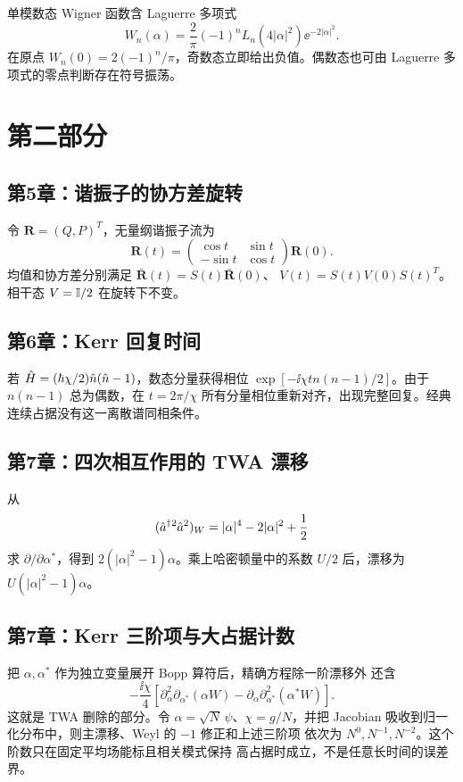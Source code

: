 单模数态 Wigner 函数含 Laguerre 多项式
\[
  W_n(\alpha)=\frac{2}{\pi}(-1)^n
  L_n(4|\alpha|^2)\ee^{-2|\alpha|^2}.
\]
在原点 $W_n(0)=2(-1)^n/\pi$，奇数态立即给出负值。偶数态也可由 Laguerre 多项式的零点判断存在符号振荡。

\section{第二部分}

\subsection*{第5章：谐振子的协方差旋转}

令 $\bm R=(Q,P)^T$，无量纲谐振子流为
\[
  \bm R(t)=
  \begin{pmatrix}\cos t&\sin t\\-\sin t&\cos t\end{pmatrix}\bm R(0).
\]
均值和协方差分别满足
$\bar{\bm R}(t)=S(t)\bar{\bm R}(0)$、
$V(t)=S(t)V(0)S(t)^T$。相干态 $V=\mathbb{I}/2$ 在旋转下不变。

\subsection*{第6章：Kerr 回复时间}

若
$\hat H=(\hbar\chi/2)\hat n(\hat n-1)$，数态分量获得相位
$\exp[-\ii\chi t n(n-1)/2]$。由于 $n(n-1)$ 总为偶数，在
$t=2\pi/\chi$ 所有分量相位重新对齐，出现完整回复。经典连续占据没有这一离散谱同相条件。

\subsection*{第7章：四次相互作用的 TWA 漂移}

从
\[
  (\hat a^{\dagger}{}^2\hat a^2)_W=|\alpha|^4-2|\alpha|^2+\frac12
\]
求 $\partial/\partial\alpha^*$，得到
$2(|\alpha|^2-1)\alpha$。乘上哈密顿量中的系数 $U/2$ 后，漂移为
$U(|\alpha|^2-1)\alpha$。

\subsection*{第7章：Kerr 三阶项与大占据计数}

把 $\alpha,\alpha^*$ 作为独立变量展开 Bopp 算符后，精确方程除一阶漂移外
还含
\[
  -\frac{\ii\chi}{4}\left[
  \partial_\alpha^2\partial_{\alpha^*}(\alpha W)
  -\partial_\alpha\partial_{\alpha^*}^2(\alpha^*W)
  \right].
\]
这就是 TWA 删除的部分。令 $\alpha=\sqrt N\,\psi$、$\chi=g/N$，并把
Jacobian 吸收到归一化分布中，则主漂移、Weyl 的 $-1$ 修正和上述三阶项
依次为 $N^0,N^{-1},N^{-2}$。这个阶数只在固定平均场能标且相关模式保持
高占据时成立，不是任意长时间的误差界。

